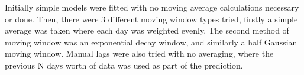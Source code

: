 Initially simple models were fitted with no moving average calculations necessary or done. Then, there were 3 different moving window types tried, firstly a simple average was taken where each day was weighted evenly. The second method of moving window was an exponential decay window, and similarly a half Gaussian moving window. Manual lags were also tried with no averaging, where the previous N days worth of data was used as part of the prediction. 